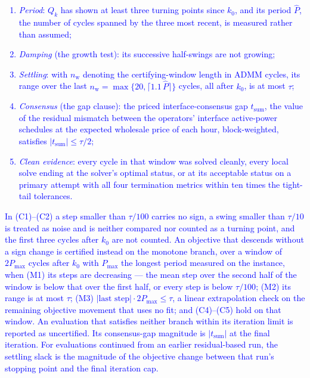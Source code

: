 \documentclass[preprint,12pt]{elsarticle}
\begin{document}
\textcolor{blue}{
    \begin{enumerate}
        \item[(C1)] \emph{Period}: $Q_k$ has shown at least three turning points since $k_0$, and its period $\hat{P}$, the number of cycles spanned by the three most recent, is measured rather than assumed;
        \item[(C2)] \emph{Damping} (the growth test): its successive half-swings are not growing;
        \item[(C3)] \emph{Settling}: with $n_{\mathrm{w}}$ denoting the certifying-window length in ADMM cycles, its range over the last $n_{\mathrm{w}} = \max\{20, \lceil 1.1\,\hat{P} \rceil\}$ cycles, all after $k_0$, is at most $\tau$;
        \item[(C4)] \emph{Consensus} (the gap clause): the priced interface-consensus gap $t_{\text{sum}}$, the value of the residual mismatch between the operators' interface active-power schedules at the expected wholesale price of each hour, block-weighted, satisfies $|t_{\text{sum}}| \le \tau/2$;
        \item[(C5)] \emph{Clean evidence}: every cycle in that window was solved cleanly, every local solve ending at the solver's optimal status, or at its acceptable status on a primary attempt with all four termination metrics within ten times the tight-tail tolerances.
    \end{enumerate}
}

\textcolor{blue}{
    In (C1)--(C2) a step smaller than $\tau/100$ carries no sign, a swing smaller than $\tau/10$ is treated as noise and is neither compared nor counted as a turning point, and the first three cycles after $k_0$ are not counted. An objective that descends without a sign change is certified instead on the monotone branch, over a window of $2P_{\max}$ cycles after $k_0$ with $P_{\max}$ the longest period measured on the instance, when (M1) its steps are decreasing --- the mean step over the second half of the window is below that over the first half, or every step is below $\tau/100$; (M2) its range is at most $\tau$; (M3) $|\text{last step}| \cdot 2P_{\max} \le \tau$, a linear extrapolation check on the remaining objective movement that uses no fit; and (C4)--(C5) hold on that window. 
    An evaluation that satisfies neither branch within its iteration limit is reported as uncertified. Its consensus-gap magnitude is $|t_{\text{sum}}|$ at the final iteration.
    For evaluations continued from an earlier residual-based run, the settling slack is the magnitude of the objective change between that run's stopping point and the final iteration cap.
}
\end{document}
